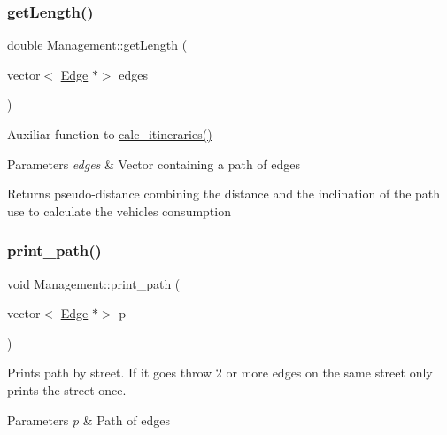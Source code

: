 \subsubsection{\texorpdfstring{get\+Length()}{getLength()}}
{\footnotesize\ttfamily double Management\+::get\+Length (\begin{DoxyParamCaption}\item[{vector$<$ \mbox{\hyperlink{class_edge}{Edge}} $\ast$$>$}]{edges }\end{DoxyParamCaption})}



Auxiliar function to \mbox{\hyperlink{class_management_af5c8090bd9be9ddd8d47749a363da302}{calc\+\_\+itineraries()}} 


\begin{DoxyParams}{Parameters}
{\em edges} & Vector containing a path of edges \\
\hline
\end{DoxyParams}
\begin{DoxyReturn}{Returns}
pseudo-\/distance combining the distance and the inclination of the path use to calculate the vehicle\textquotesingle{}s consumption 
\end{DoxyReturn}
\mbox{\label{class_management_a24d2b454c34f53a3dbcddde32cd21a9c}} 
\subsubsection{\texorpdfstring{print\+\_\+path()}{print\_path()}}
{\footnotesize\ttfamily void Management\+::print\+\_\+path (\begin{DoxyParamCaption}\item[{vector$<$ \mbox{\hyperlink{class_edge}{Edge}} $\ast$$>$}]{p }\end{DoxyParamCaption})}



Prints path by street. If it goes throw 2 or more edges on the same street only prints the street once. 


\begin{DoxyParams}{Parameters}
{\em p} & Path of edges \\
\hline
\end{DoxyParams}
\mbox{\label{class_management_a06aef0ba82fa962d986eb9de55b8816b}} 
